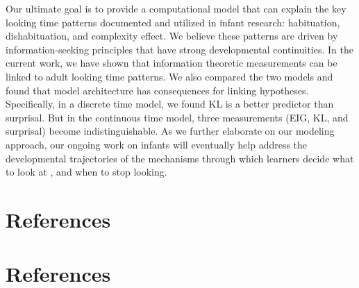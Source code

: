 \documentclass[10pt, letterpaper]{article}
\begin{document}
Our ultimate goal is to provide a computational model that can explain
the key looking time patterns documented and utilized in infant
research: habituation, dishabituation, and complexity effect. We believe
these patterns are driven by information-seeking principles that have
strong developmental continuities. In the current work, we have shown
that information theoretic measurements can be linked to adult looking
time patterns. We also compared the two models and found that model
architecture has consequences for linking hypotheses. Specifically, in a
discrete time model, we found KL is a better predictor than surprisal.
But in the continuous time model, three measurements (EIG, KL, and
surprisal) become indistinguishable. As we further elaborate on our
modeling approach, our ongoing work on infants will eventually help
address the developmental trajectories of the mechanisms through which
learners decide what to look at , and when to stop looking.

\hypertarget{references}{%
\section{References}\label{references}}

\hypertarget{references-1}{%
\section{References}\label{references-1}}

\setlength{\parindent}{-0.1in} 
\setlength{\leftskip}{0.125in}

\noindent
\end{document}

